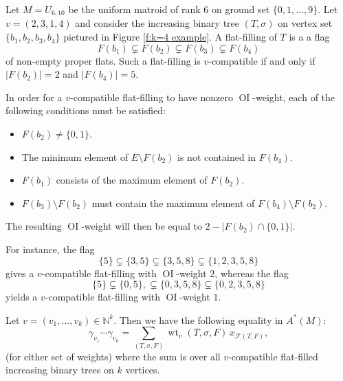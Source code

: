 \documentclass[ALCO,published]{cedram}
\numberwithin{equation}{section}
\numberwithin{figure}{section}
\newcommand{\N}{\mathbb{N}}
\newcommand{\cF}{\mathcal{F}}
\DeclareMathOperator{\OI}{OI}
\DeclareMathOperator{\wt}{wt}
\begin{document}
\begin{exam}
    Let $M = U_{6,10}$ be the uniform matroid of rank $6$ on ground set $\{0,1,\dots,9\}$. Let $v = (2,3,1,4)$ and consider the increasing binary tree $(T,\sigma)$ on vertex set $\{b_1, b_2, b_3, b_4\}$ pictured in Figure \ref{f:k=4 example}. A flat-filling of $T$ is a a flag
    \[ F(b_1) \subsetneq F(b_2) \subsetneq F(b_3) \subsetneq F(b_4) \]
    of non-empty proper flats. Such a flat-filling is $v$-compatible if and only if $|F(b_2)| = 2$ and $|F(b_4)| = 5$.

    In order for a $v$-compatible flat-filling to have nonzero $\OI$-weight, each of the following conditions must be satisfied:
    \begin{itemize}
        \item $F(b_2) \neq \{0,1\}$.
        \item The minimum element of $E \setminus F(b_2)$ is not contained in $F(b_4)$.
        \item $F(b_1)$ consists of the maximum element of $F(b_2)$.
        \item $F(b_3) \setminus F(b_2)$ must contain the maximum element of $F(b_4) \setminus F(b_2)$.
    \end{itemize}
    The resulting $\OI$-weight will then be equal to $2 - |F(b_2) \cap \{0,1\}|$.

    For instance, the flag
    \[ \{5\} \subsetneq \{3,5\} \subsetneq \{3,5,8\} \subsetneq \{1, 2,3,5,8\} \]
    gives a $v$-compatible flat-filling with $\OI$-weight $2$, whereas the flag
    \[ \{5\} \subsetneq \{0,5\}, \subsetneq \{0,3,5,8\} \subsetneq \{0,2,3,5,8\}\]
    yields a $v$-compatible flat-filling with $\OI$-weight $1$.
\end{exam}

\begin{theorem} \label{t:postnikov}
    Let $v = (v_1, \ldots, v_k) \in \N^k$. Then we have the following equality in $A^*(M)$:
    \[ \gamma_{v_1} \cdots \gamma_{v_k} = \sum_{(T,\sigma,F)} \wt_v(T,\sigma,F) \, x_{\cF(T,F)}, \]
    (for either set of weights) where the sum is over all $v$-compatible flat-filled increasing binary trees on $k$ vertices.
\end{theorem}
\end{document}
